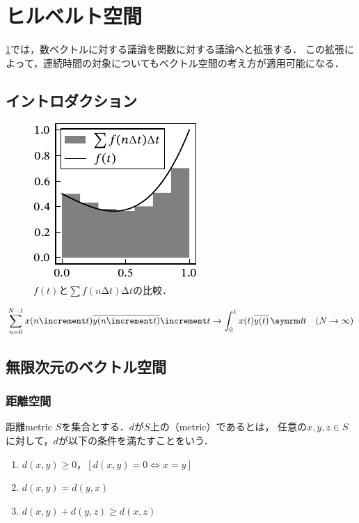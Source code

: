 \documentclass[../../main]{subfiles}
\begin{document}
\chapter{ヒルベルト空間}
\label{chapter:hilbert_space}

\begin{lead}
  \cref{chapter:hilbert_space}では，数ベクトルに対する議論を関数に対する議論へと拡張する．
  この拡張によって，連続時間の対象についてもベクトル空間の考え方が適用可能になる．
\end{lead}

\section{イントロダクション}

\begin{figure}[htbp]
  \centering
  \includegraphics{riemann_sum.pdf}
  \caption{\(f(t)\)と\(\sum f(n\increment t)\increment t\)の比較．}
\end{figure}

\[
  \sum_{n=0}^{N-1}x(n\increment t)\conj{y(n\increment t)}\increment t \to \int_0^1x(t)\conj{y(t)}\intd{t}\quad(N\to\infty)
\]

\section{無限次元のベクトル空間}

\subsection{距離空間}

\begin{definition}{距離}{metric}
  \(S\)を集合とする．\(d\)が\(S\)上の（metric）であるとは，
  任意の\(x,y,z\in S\)に対して，\(d\)が以下の条件を満たすことをいう．
  \begin{enumerate}
    \item \(d(x,y)\geq 0\)，\([d(x,y)=0\iff x=y]\)
    \item \(d(x,y)=d(y,x)\)
    \item \(d(x,y)+d(y,z)\geq d(x,z)\)
  \end{enumerate}
\end{definition}
\end{document}

